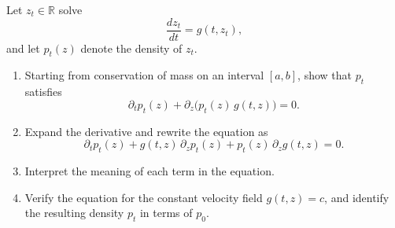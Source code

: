 \begin{exercise}
Let \(z_t\in\mathbb{R}\) solve
\[
\frac{dz_t}{dt}=g(t,z_t),
\]
and let \(p_t(z)\) denote the density of \(z_t\).

\begin{enumerate}
\item Starting from conservation of mass on an interval \([a,b]\), show that \(p_t\) satisfies
\[
\partial_t p_t(z)+\partial_z\bigl(p_t(z)\,g(t,z)\bigr)=0.
\]
\item Expand the derivative and rewrite the equation as
\[
\partial_t p_t(z)+g(t,z)\,\partial_z p_t(z)+p_t(z)\,\partial_z g(t,z)=0.
\]
\item Interpret the meaning of each term in the equation.
\item Verify the equation for the constant velocity field \(g(t,z)=c\), and identify the resulting density \(p_t\) in terms of \(p_0\).
\end{enumerate}
\end{exercise}


